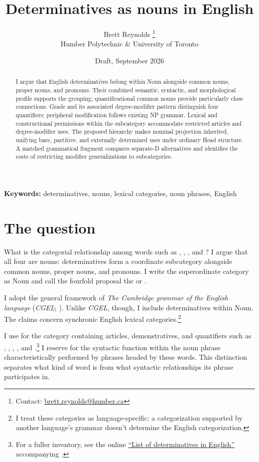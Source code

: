 \documentclass[12pt]{article}
\title{Determinatives as nouns in English}
\author{Brett Reynolds \orcidlink{0000-0003-0073-7195}%
\thanks{Contact: \href{mailto:brett.reynolds@humber.ca}{brett.reynolds@humber.ca}}\\
Humber Polytechnic \& University of Toronto}
\date{Draft, September 2026}
\begin{document}
\maketitle

\begin{abstract}
I argue that English determinatives belong within Noun alongside common nouns, proper nouns, and pronouns. Their combined semantic, syntactic, and morphological profile supports the grouping; quantificational common nouns provide particularly close connections. Grade and its associated degree-modifier pattern distinguish four quantifiers; peripheral modification follows existing NP grammar. Lexical and constructional permissions within the subcategory accommodate restricted articles and degree-modifier uses. The proposed hierarchy makes nominal projection inherited, unifying bare, partitive, and externally determined uses under ordinary Head structure. A matched grammatical fragment compares separate-D alternatives and identifies the costs of restricting modifier generalizations to subcategories.
\end{abstract}

\noindent\textbf{Keywords:} determinatives, nouns, lexical categories, noun phrases, English

\section{The question}\label{sec:intro}

What is the categorial relationship among words such as , , , and ? I argue that all four are nouns: determinatives form a coordinate subcategory alongside common nouns, proper nouns, and pronouns. I write the superordinate category as Noun and call the fourfold proposal the  or .

I adopt the general framework of \textit{The Cambridge grammar of the English language} (\textit{CGEL}; \citealt{huddleston2002}). Unlike \textit{CGEL}, though, I include determinatives within Noun. The claims concern synchronic English lexical categories.\footnote{I treat these categories as language-specific: a categorization supported by another language's grammar doesn't determine the English categorization.}

I use  for the category containing articles, demonstratives, and quantifiers such as , , , , and .\footnote{For a fuller inventory, see the online \href{https://www.cambridge.org/highereducation/api/resources/2AC8DF5CA558F8A6FCDFACD0EAF8EA08}{\enquote{List of determinatives in English}} accompanying \textcite{Huddleston2021}.} I reserve  for the syntactic function within the noun phrase characteristically performed by phrases headed by these words. This distinction separates what kind of word  is from what syntactic relationships its phrase participates in.
\end{document}
